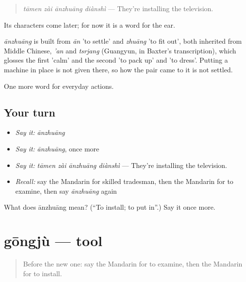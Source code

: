 \begin{quote}
\emph{tāmen zài ānzhuāng diànshì} — They're installing the television.
\end{quote}

Its characters come later; for now it is a word for the ear.

\begin{cousinweb}
\emph{ānzhuāng} is built from \emph{ān} 'to settle' and \emph{zhuāng} 'to fit out', both inherited from Middle Chinese, \emph{'an} and \emph{tsrjang} (Guangyun, in Baxter's transcription), which glosses the first 'calm' and the second 'to pack up' and 'to dress'. Putting a machine in place is not given there, so how the pair came to it is not settled.
\end{cousinweb}

\begin{grammarlens}[title={What you've built}]
One more word for everyday actions.
\end{grammarlens}

\subsection*{Your turn}
\begin{itemize}
\raggedright
  \item \emph{Say it:} \emph{ānzhuāng}
  \item \emph{Say it:} \emph{ānzhuāng}, once more
  \item \emph{Say it:} \emph{tāmen zài ānzhuāng diànshì} — They're installing the television.
  \item \emph{Recall:} say the Mandarin for skilled tradesman, then the Mandarin for to examine, then say \emph{ānzhuāng} again
\end{itemize}

\begin{tcolorbox}[breakable,colback=teal!4,colframe=teal!35!black,title={Before you move on}]
What does ānzhuāng mean? (\textquotedblleft{}To install; to put in\textquotedblright{}.) Say it once more.
\end{tcolorbox}
\section[gōngjù]{gōngjù — tool}

\label{lesson:ZH-C208-gongju}



\begin{quote}
Before the new one: say the Mandarin for to examine, then the Mandarin for to install.
\end{quote}


